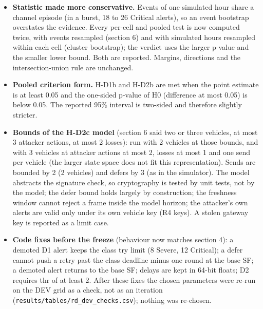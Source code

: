 \begin{itemize}
\item \textbf{Statistic made more conservative.} Events of one simulated hour share a channel episode (in a burst, 18 to 26 Critical alerts), so an event bootstrap overstates the evidence. Every per-cell and pooled test is now computed twice, with events resampled (section 6) and with simulated hours resampled within each cell (cluster bootstrap); the verdict uses the larger p-value and the smaller lower bound. Both are reported. Margins, directions and the intersection-union rule are unchanged.
\item \textbf{Pooled criterion form.} H-D1b and H-D2b are met when the point estimate is at least 0.05 and the one-sided p-value of H0 (difference at most 0.05) is below 0.05. The reported 95\% interval is two-sided and therefore slightly stricter.
\item \textbf{Bounds of the H-D2c model} (section 6 said two or three vehicles, at most 3 attacker actions, at most 2 losses): run with 2 vehicles at those bounds, and with 3 vehicles at attacker actions at most 2, losses at most 1 and one send per vehicle (the larger state space does not fit this representation). Sends are bounded by 2 (2 vehicles) and defers by 3 (as in the simulator). The model abstracts the signature check, so cryptography is tested by unit tests, not by the model; the defer bound holds largely by construction; the freshness window cannot reject a frame inside the model horizon; the attacker's own alerts are valid only under its own vehicle key (R4 keys). A stolen gateway key is reported as a limit case.
\item \textbf{Code fixes before the freeze} (behaviour now matches section 4): a demoted D1 alert keeps the class try limit (8 Severe, 12 Critical); a defer cannot push a retry past the class deadline minus one round at the base SF; a demoted alert returns to the base SF; delays are kept in 64-bit floats; D2 requires thr of at least 2. After these fixes the chosen parameters were re-run on the DEV grid as a check, not as an iteration (\texttt{results/tables/rd\_dev\_checks.csv}); nothing was re-chosen.

\end{itemize}
